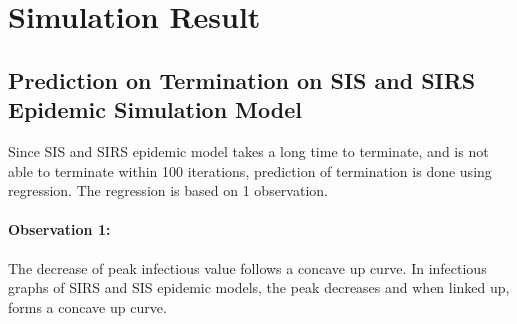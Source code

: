 \documentclass{subfile}
\begin{document}
  \section{Simulation Result}
  \subsection{Prediction on Termination on SIS and SIRS Epidemic Simulation Model}
  Since SIS and SIRS epidemic model takes a long time to terminate, and is not able to terminate within 100 iterations, prediction of termination is done using regression. The regression is based on 1 observation.

  \paragraph{Observation 1: }The decrease of peak infectious value follows a concave up curve. In infectious graphs of SIRS and SIS epidemic models, the peak decreases and when linked up, forms a concave up curve.
\end{document}
